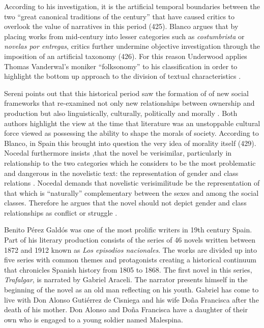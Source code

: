 \documentclass[12pt]{report}
\begin{document}
According to his investigation, it is the artificial temporal boundaries between the two \enquote{great canonical traditions of the century} that have caused critics to overlook the value of narratives in this period (425)\nocite{Blanco2000}.
Blanco argues that by placing works from mid-century into lesser categories such as \textit{costumbrista} or \textit{novelas por entregas}, critics further undermine objective investigation through the imposition of an artificial taxonomy (426)\nocite{Blanco2000}.
For this reason Underwood applies Thomas Vanderwal's moniker \enquote{folksonomy} to his classification in order to highlight the bottom up approach to the division of textual characteristics \cite{Underwood2014, Vanderwal2007}.

Sereni points out that this historical period saw the formation of of new social frameworks that re-examined not only new relationships between ownership and production but also linguistically, culturally, politically and morally \cite[Sereni in][429]{Blanco2000}.
Both authors highlight the view at the time that literature was an unstoppable cultural force viewed as possessing the ability to shape the morals of society. 
According to Blanco, in Spain this brought into question the very idea of morality itself (429)\nocite{Blanco2000}.
Nocedal furthermore insists ,that the novel be verisimilar, particularly in relationship to the two categories which he considers to be the most
problematic and dangerous in the novelistic text: the representation of gender and class relations \cite[430]{Blanco2000}.
Nocedal demands that novelistic verisimilitude be the representation of that which is “naturally” complementary between the sexes and among the social classes. 
Therefore he argues that the novel should not depict gender and class relationships as conflict or struggle \cite[430]{Blanco2000}.

Benito Pérez Galdós was one of the most prolific writers in 19th century Spain. 
Part of his literary production consists of the series of 46 novels written between 1872 and 1912 known as \textit{Los episodios nacionales}.
The works are divided up into five series with common themes and protagonists creating a historical continuum that chronicles Spanish history from 1805 to 1868.
The first novel in this series, \textit{Trafalgar}, is narrated by Gabriel Araceli.
The narrator presents himself in the beginning of the novel as an old man reflecting on his youth.
Gabriel has come to live with Don Alonso Gutiérrez de Cisniega and his wife Doña Francisca after the death of his mother.
Don Alonso and Doña Francisca have a daughter of their own who is engaged to a young soldier named Malespina.
\end{document}
